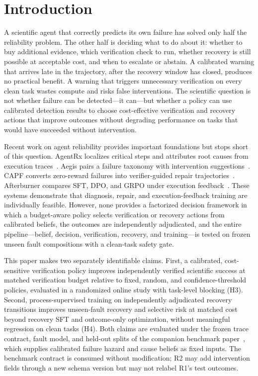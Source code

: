 \section{Introduction}
\label{sec:introduction}

A scientific agent that correctly predicts its own failure has solved only
half the reliability problem. The other half is deciding what to do about
it: whether to buy additional evidence, which verification check to run,
whether recovery is still possible at acceptable cost, and when to escalate
or abstain. A calibrated warning that arrives late in the trajectory,
after the recovery window has closed, produces no practical benefit. A
warning that triggers unnecessary verification on every clean task wastes
compute and risks false interventions. The scientific question is not
whether failure can be detected—it can—but whether a policy can use
calibrated detection results to choose cost-effective verification and
recovery actions that improve outcomes without degrading performance on
tasks that would have succeeded without intervention.

Recent work on agent reliability provides important foundations but stops
short of this question. AgentRx localizes critical steps and attributes
root causes from execution traces~\citep{agentrx2026}. Aegis pairs a
failure taxonomy with intervention suggestions~\citep{aegis2025}. CAPF
converts zero-reward failures into verifier-guided repair
trajectories~\citep{capf2026}. Afterburner compares SFT, DPO, and GRPO
under execution feedback~\citep{afterburner2025}. These systems demonstrate
that diagnosis, repair, and execution-feedback training are individually
feasible. However, none provides a factorized decision framework in which a
budget-aware policy selects verification or recovery actions from calibrated
beliefs, the outcomes are independently adjudicated, and the entire
pipeline—belief, decision, verification, recovery, and training—is tested
on frozen unseen fault compositions with a clean-task safety gate.

This paper makes two separately identifiable claims. First, a calibrated,
cost-sensitive verification policy improves independently verified
scientific success at matched verification budget relative to fixed, random,
and confidence-threshold policies, evaluated in a randomized online study
with task-level blocking (H3). Second, process-supervised training on
independently adjudicated recovery transitions improves unseen-fault
recovery and selective risk at matched cost beyond recovery SFT and
outcome-only optimization, without meaningful regression on clean tasks
(H4). Both claims are evaluated under the frozen trace contract, fault
model, and held-out splits of the companion benchmark paper~\citep{reliability_benchmark}, which
supplies calibrated failure hazard and cause beliefs as fixed inputs.
The benchmark contract is consumed without modification; R2 may add
intervention fields through a new schema version but may not relabel
R1's test outcomes.

